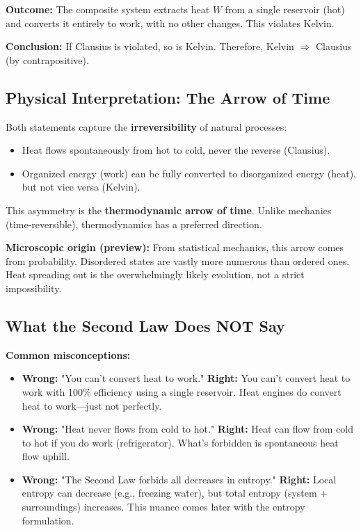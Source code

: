 \documentclass[9pt,twocoloumn]{article}
\begin{document}
\textbf{Outcome:} The composite system extracts heat $W$ from a single reservoir (hot) and converts it entirely to work, with no other changes. This violates Kelvin.

\textbf{Conclusion:} If Clausius is violated, so is Kelvin. Therefore, Kelvin $\Rightarrow$ Clausius (by contrapositive).

\subsection{Physical Interpretation: The Arrow of Time}

Both statements capture the \textbf{irreversibility} of natural processes:
\begin{itemize}
    \item Heat flows spontaneously from hot to cold, never the reverse (Clausius).
    \item Organized energy (work) can be fully converted to disorganized energy (heat), but not vice versa (Kelvin).
\end{itemize}

This asymmetry is the \textbf{thermodynamic arrow of time}. Unlike mechanics (time-reversible), thermodynamics has a preferred direction.

\textbf{Microscopic origin (preview):} From statistical mechanics, this arrow comes from probability. Disordered states are vastly more numerous than ordered ones. Heat spreading out is the overwhelmingly likely evolution, not a strict impossibility.

\subsection{What the Second Law Does NOT Say}

\textbf{Common misconceptions:}
\begin{itemize}
    \item \textbf{Wrong:} "You can't convert heat to work." \textbf{Right:} You can't convert heat to work with 100\% efficiency using a single reservoir. Heat engines do convert heat to work—just not perfectly.
    \item \textbf{Wrong:} "Heat never flows from cold to hot." \textbf{Right:} Heat can flow from cold to hot if you do work (refrigerator). What's forbidden is spontaneous heat flow uphill.
    \item \textbf{Wrong:} "The Second Law forbids all decreases in entropy." \textbf{Right:} Local entropy can decrease (e.g., freezing water), but total entropy (system + surroundings) increases. This nuance comes later with the entropy formulation.
\end{itemize}
\end{document}
